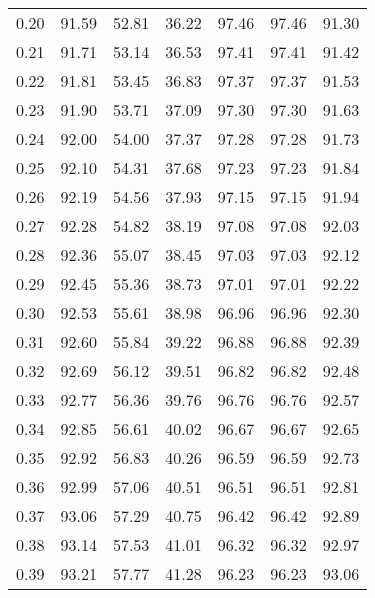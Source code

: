 \begin{tabular}{|c|c|c|c|c|c|c|}
      0.20 &     91.59 &     52.81 &      36.22 &   97.46 &      97.46 &         91.30 \\
      0.21 &     91.71 &     53.14 &      36.53 &   97.41 &      97.41 &         91.42 \\
      0.22 &     91.81 &     53.45 &      36.83 &   97.37 &      97.37 &         91.53 \\
      0.23 &     91.90 &     53.71 &      37.09 &   97.30 &      97.30 &         91.63 \\
      0.24 &     92.00 &     54.00 &      37.37 &   97.28 &      97.28 &         91.73 \\
      0.25 &     92.10 &     54.31 &      37.68 &   97.23 &      97.23 &         91.84 \\
      0.26 &     92.19 &     54.56 &      37.93 &   97.15 &      97.15 &         91.94 \\
      0.27 &     92.28 &     54.82 &      38.19 &   97.08 &      97.08 &         92.03 \\
      0.28 &     92.36 &     55.07 &      38.45 &   97.03 &      97.03 &         92.12 \\
      0.29 &     92.45 &     55.36 &      38.73 &   97.01 &      97.01 &         92.22 \\
      0.30 &     92.53 &     55.61 &      38.98 &   96.96 &      96.96 &         92.30 \\
      0.31 &     92.60 &     55.84 &      39.22 &   96.88 &      96.88 &         92.39 \\
      0.32 &     92.69 &     56.12 &      39.51 &   96.82 &      96.82 &         92.48 \\
      0.33 &     92.77 &     56.36 &      39.76 &   96.76 &      96.76 &         92.57 \\
      0.34 &     92.85 &     56.61 &      40.02 &   96.67 &      96.67 &         92.65 \\
      0.35 &     92.92 &     56.83 &      40.26 &   96.59 &      96.59 &         92.73 \\
      0.36 &     92.99 &     57.06 &      40.51 &   96.51 &      96.51 &         92.81 \\
      0.37 &     93.06 &     57.29 &      40.75 &   96.42 &      96.42 &         92.89 \\
      0.38 &     93.14 &     57.53 &      41.01 &   96.32 &      96.32 &         92.97 \\
      0.39 &     93.21 &     57.77 &      41.28 &   96.23 &      96.23 &         93.06 \\

\end{tabular}
